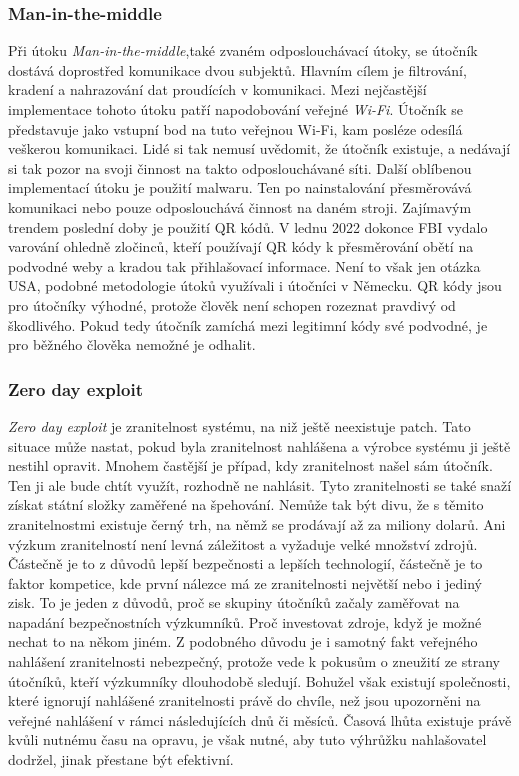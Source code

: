 \subsubsection{Man-in-the-middle}
Při útoku \textit{Man-in-the-middle},také zvaném odposlouchávací útoky, se útočník dostává doprostřed komunikace dvou subjektů.
Hlavním cílem je filtrování, kradení a nahrazování dat proudících v komunikaci.
Mezi nejčastější implementace tohoto útoku patří napodobování veřejné \textit{Wi-Fi}.
Útočník se představuje jako vstupní bod na tuto veřejnou Wi-Fi, kam posléze odesílá veškerou komunikaci.
Lidé si tak nemusí uvědomit, že útočník existuje, a nedávají si tak pozor na svoji činnost na takto odposlouchávané síti.
Další oblíbenou implementací útoku je použití malwaru.
Ten po nainstalování přesměrovává komunikaci nebo pouze odposlouchává činnost na daném stroji.
Zajímavým trendem poslední doby je použití QR kódů.
V lednu 2022 dokonce FBI vydalo varování ohledně zločinců, kteří používají QR kódy k přesměrování obětí na podvodné weby a kradou tak přihlašovací informace.
Není to však jen otázka USA, podobné metodologie útoků využívali i útočníci v Německu.
QR kódy jsou pro útočníky výhodné, protože člověk není schopen rozeznat pravdivý od škodlivého.
Pokud tedy útočník zamíchá mezi legitimní kódy své podvodné, je pro běžného člověka nemožné je odhalit.\cite{Enisa_thread_landscape, cisco_most_common_attack}


\subsubsection{Zero day exploit}
\textit{Zero day exploit} je zranitelnost systému, na niž ještě neexistuje patch.
Tato situace může nastat, pokud byla zranitelnost nahlášena a výrobce systému ji ještě nestihl opravit.
Mnohem častější je případ, kdy zranitelnost našel sám útočník.
Ten ji ale bude chtít využít, rozhodně ne nahlásit.
Tyto zranitelnosti se také snaží získat státní složky zaměřené na špehování.
Nemůže tak být divu, že s těmito zranitelnostmi existuje černý trh\cite{world_end_2021}, na němž se prodávají až za miliony dolarů.
Ani výzkum zranitelností není levná záležitost a vyžaduje velké množství zdrojů.
Částečně je to z důvodů lepší bezpečnosti a lepších technologií, částečně je to faktor kompetice, kde první nálezce má ze zranitelnosti největší nebo i jediný zisk.
To je jeden z důvodů, proč se skupiny útočníků začaly zaměřovat na napadání bezpečnostních výzkumníků.
Proč investovat zdroje, když je možné nechat to na někom jiném.
Z podobného důvodu je i samotný fakt veřejného nahlášení zranitelnosti nebezpečný, protože vede k pokusům o zneužití ze strany útočníků, kteří výzkumníky dlouhodobě sledují.
Bohužel však existují společnosti, které ignorují nahlášené zranitelnosti právě do chvíle, než jsou upozorněni na veřejné nahlášení v rámci následujících dnů či měsíců.
Časová lhůta existuje právě kvůli nutnému času na opravu, je však nutné, aby tuto výhrůžku nahlašovatel dodržel, jinak přestane být efektivní.\cite{Enisa_thread_landscape}


